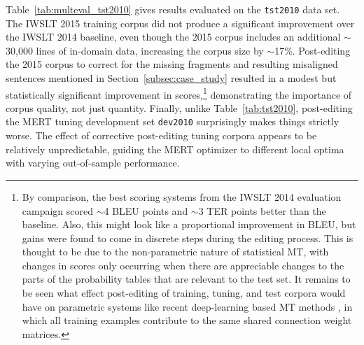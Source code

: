 {Table~\ref{tab:multeval_tst2010} gives results evaluated on the {\small \tt tst2010} data set.
The IWSLT 2015 training corpus did not produce a significant improvement over the IWSLT 2014 baseline, even though the 2015 corpus includes an additional $\sim$30,000 lines of in-domain data, increasing the corpus size by $\sim$17\%.
Post-editing the 2015 corpus to correct for the missing fragments and resulting misaligned sentences mentioned in Section~\ref{subsec:case_study} resulted in a modest but statistically significant improvement in scores,\footnote{
By comparison, the best scoring systems from the IWSLT 2014 evaluation campaign  scored $\sim$4 BLEU points and $\sim$3 TER points better than the baseline.
Also, this might look like a proportional improvement in BLEU, but gains were found to come in discrete steps during the editing process. 
This is thought to be due to the non-parametric nature of statistical MT, with changes in scores only occurring when there are appreciable changes to the parts of the probability tables that are relevant to the test set.
It remains to be seen what effect post-editing of training, tuning, and test corpora would have on parametric systems like recent deep-learning based MT methods , in which all training examples contribute to the same shared connection weight matrices.
} demonstrating the importance of corpus quality, not just quantity.
Finally, unlike Table~\ref{tab:tst2010}, post-editing the MERT tuning development set {\small \tt dev2010} surprisingly makes things strictly worse.
The effect of corrective post-editing tuning corpora appears to be relatively unpredictable, guiding the MERT optimizer to different local optima with varying out-of-sample performance.






}
